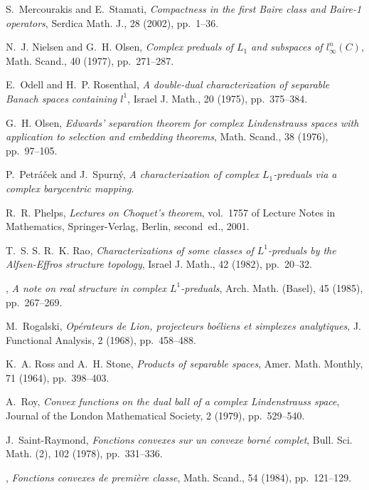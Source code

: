 \documentclass{amsart}
\numberwithin{equation}{section}
\theoremstyle{definition}
\begin{document}
\begin{thebibliography}{10}
{\sc S.~Mercourakis and E.~Stamati}, {\em Compactness in the first {B}aire
  class and {B}aire-1 operators}, Serdica Math. J., 28 (2002), pp.~1--36.

{\sc N.~J. Nielsen and G.~H. Olsen}, {\em Complex preduals of {$L_{1}$} and
  subspaces of {$l^{n}_{\infty }(C)$}}, Math. Scand., 40 (1977), pp.~271--287.

{\sc E.~Odell and H.~P. Rosenthal}, {\em A double-dual characterization of
  separable {B}anach spaces containing {$l^{1}$}}, Israel J. Math., 20 (1975),
  pp.~375--384.

{\sc G.~H. Olsen}, {\em Edwards' separation theorem for complex {L}indenstrauss
  spaces with application to selection and embedding theorems}, Math. Scand.,
  38 (1976), pp.~97--105.

{\sc P.~Petr\'a\v{c}ek and J.~Spurn\'y}, {\em A characterization of complex{
  $L_1$}-preduals via a complex barycentric mapping}.

{\sc R.~R. Phelps}, {\em Lectures on {C}hoquet's theorem}, vol.~1757 of Lecture
  Notes in Mathematics, Springer-Verlag, Berlin, second~ed., 2001.

{\sc T.~S. S. R.~K. Rao}, {\em Characterizations of some classes of
  {$L^{1}$}-preduals by the {A}lfsen-{E}ffros structure topology}, Israel J.
  Math., 42 (1982), pp.~20--32.

\leavevmode\vrule height 2pt depth -1.6pt width 23pt, {\em A note on real
  structure in complex {$L^1$}-preduals}, Arch. Math. (Basel), 45 (1985),
  pp.~267--269.

{\sc M.~Rogalski}, {\em Op\'erateurs de {L}ion, projecteurs bo\'eliens et
  simplexes analytiques}, J. Functional Analysis, 2 (1968), pp.~458--488.

{\sc K.~A. Ross and A.~H. Stone}, {\em Products of separable spaces}, Amer.
  Math. Monthly, 71 (1964), pp.~398--403.

{\sc A.~Roy}, {\em Convex functions on the dual ball of a complex
  {L}indenstrauss space}, Journal of the London Mathematical Society, 2 (1979),
  pp.~529--540.

{\sc J.~Saint-Raymond}, {\em Fonctions convexes sur un convexe born\'e
  complet}, Bull. Sci. Math. (2), 102 (1978), pp.~331--336.

\leavevmode\vrule height 2pt depth -1.6pt width 23pt, {\em Fonctions convexes
  de premi\`ere classe}, Math. Scand., 54 (1984), pp.~121--129.


\end{thebibliography}
\end{document}
